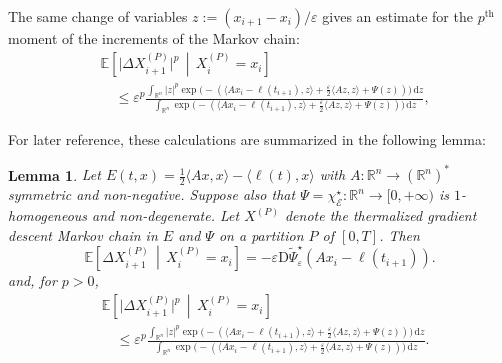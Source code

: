 \documentclass[reqno]{amsart}
\newtheorem{lemma}[theorem]{Lemma}
\theoremstyle{definition}
\begin{document}
The same change of variables $z := (x_{i + 1} - x_{i}) / {\varepsilon}$ gives an estimate for the $p^{\mathrm{th}}$ moment of the increments of the Markov chain:
\begin{align*}
	& {\mathbb{E}} \left[ \big| \Delta X_{i + 1}^{(P)} |^{p} \,\middle|\, X_{i}^{(P)} = x_{i} \right] \\
	& \quad \leq {\varepsilon}^{p} \frac{\displaystyle \int_{{\mathbb{R}}^{n}} | z |^{p} \exp \big( - ( \langle A x_{i} - \ell(t_{i + 1}), z \rangle + \tfrac{\varepsilon}{2} \langle A z, z \rangle + \Psi(z)) \big) \, {\mathrm{d}} z}{\displaystyle \int_{{\mathbb{R}}^{n}} \exp \big( - ( \langle A x_{i} - \ell(t_{i + 1}), z \rangle + \tfrac{\varepsilon}{2} \langle A z, z \rangle + \Psi(z)) \big) \, {\mathrm{d}} z},
\end{align*}

For later reference, these calculations are summarized in the following lemma:

\begin{lemma}
	\label{lem:Markov-ExpAndMoments}
	Let $E(t, x) = \frac{1}{2} \langle A x, x \rangle - \langle \ell(t), x \rangle$ with $A \colon {\mathbb{R}}^{n} \to ({\mathbb{R}}^{n})^{\ast}$ symmetric and non-negative.  Suppose also that $\Psi = \chi_{\mathcal{E}}^{\star} \colon {\mathbb{R}}^{n} \to [0, + \infty)$ is $1$-homogeneous and non-degenerate.  Let $X^{(P)}$ denote the thermalized gradient descent Markov chain in $E$ and $\Psi$ on a partition $P$ of $[0, T]$.  Then
	\[
		{\mathbb{E}} \left[ \Delta X_{i + 1}^{(P)} \,\middle|\, X_{i}^{(P)} = x_{i} \right] = - {\varepsilon} {\mathrm{D}} {\widetilde{\Psi}}_{\varepsilon}^{\star} (A x_{i} - \ell(t_{i + 1})).
	\]
	and, for $p > 0$,
	\begin{align*}
		& {\mathbb{E}} \left[ \big| \Delta X_{i + 1}^{(P)} |^{p} \,\middle|\, X_{i}^{(P)} = x_{i} \right] \\
		& \quad \leq {\varepsilon}^{p} \frac{\displaystyle \int_{{\mathbb{R}}^{n}} | z |^{p} \exp \big( - ( \langle A x_{i} - \ell(t_{i + 1}), z \rangle + \tfrac{\varepsilon}{2} \langle A z, z \rangle + \Psi(z)) \big) \, {\mathrm{d}} z}{\displaystyle \int_{{\mathbb{R}}^{n}} \exp \big( - ( \langle A x_{i} - \ell(t_{i + 1}), z \rangle + \tfrac{\varepsilon}{2} \langle A z, z \rangle + \Psi(z)) \big) \, {\mathrm{d}} z}.
	\end{align*}
\end{lemma}
\end{document}
